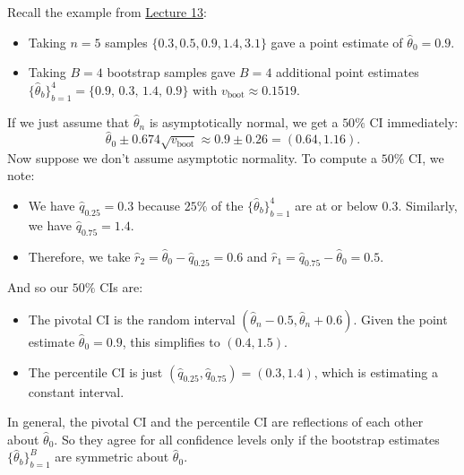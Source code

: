 Recall the example from
\href{/18.650/lectures/13/#example-bootstrapping-the-median}{Lecture 13}:
\begin{itemize}
    \item Taking $n = 5$ samples $\{0.3, 0.5, 0.9, 1.4, 3.1\}$
    gave a point estimate of $\hat{\theta}_0 = 0.9$.
    \item Taking $B = 4$ bootstrap samples gave
    $B = 4$ additional point estimates
    $\{\hat{\theta}_b\}_{b = 1}^4 = \{0.9,\, 0.3,\, 1.4,\, 0.9\}$
    with $v_{\mathrm{boot}} \approx 0.1519$.
\end{itemize}
If we just assume that $\hat{\theta}_n$ is asymptotically normal,
we get a $50\%$ CI immediately:
\[ \hat{\theta}_0 \pm 0.674\sqrt{v_{\mathrm{boot}}}
\approx 0.9 \pm 0.26 = (0.64, 1.16). \]
Now suppose we don't assume asymptotic normality.
To compute a $50\%$ CI, we note:
\begin{itemize}
    \item We have $\hat{q}_{0.25} = 0.3$ because
    $25\%$ of the $\{\hat{\theta}_b\}_{b = 1}^4$
    are at or below $0.3$.
    Similarly, we have $\hat{q}_{0.75} = 1.4$.
    \item Therefore, we take
    $\hat{r}_2 = \hat{\theta}_0 - \hat{q}_{0.25} = 0.6$
    and $\hat{r}_1 = \hat{q}_{0.75} - \hat{\theta}_0 = 0.5$.
\end{itemize}
And so our $50\%$ CIs are:
\begin{itemize}
    \item The pivotal CI is the random interval
    $(\hat{\theta}_n - 0.5, \hat{\theta}_n + 0.6)$.
    Given the point estimate $\hat{\theta}_0 = 0.9$,
    this simplifies to $(0.4, 1.5)$.
    \item The percentile CI is just $(\hat{q}_{0.25}, \hat{q}_{0.75})
    = (0.3, 1.4)$, which is estimating a constant interval.
\end{itemize}

\begin{remark}
    In general, the pivotal CI and the percentile CI
    are reflections of each other about $\hat{\theta}_0$.
    So they agree for all confidence levels
    only if the bootstrap estimates $\{\hat{\theta}_b\}_{b = 1}^B$
    are symmetric about $\hat{\theta}_0$.
\end{remark}

